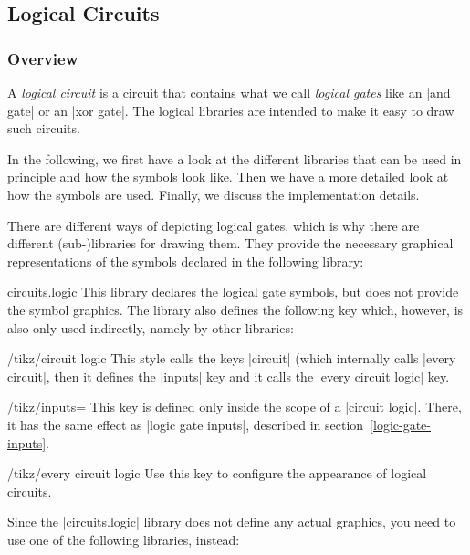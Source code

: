 \subsection{Logical Circuits}

\subsubsection{Overview}

A \emph{logical circuit} is a circuit that contains what we call \emph{logical
gates} like an |and gate| or an |xor gate|. The logical libraries are intended
to make it easy to draw such circuits.

In the following, we first have a look at the different libraries that can be
used in principle and how the symbols look like. Then we have a more detailed
look at how the symbols are used. Finally, we discuss the implementation
details.

There are different ways of depicting logical gates, which is why there are
different (sub-)libraries for drawing them. They provide the necessary
graphical representations of the symbols declared in the following library:

\begin{tikzlibrary}{circuits.logic}
    This library declares the logical gate symbols, but does not provide the
    symbol graphics. The library also defines the following key which, however,
    is also only used indirectly, namely by other libraries:
    \begin{key}{/tikz/circuit logic}
        This style calls the keys |circuit| (which internally calls
        |every circuit|, then it defines the |inputs| key and it calls the
        |every circuit logic| key.
        \begin{key}{/tikz/inputs=}
            This key is defined only inside the scope of a |circuit logic|.
            There, it has the same effect as |logic gate inputs|, described in
            section~\ref{logic-gate-inputs}.
        \end{key}
        \begin{stylekey}{/tikz/every circuit logic}
            Use this key to configure the appearance of logical circuits.
        \end{stylekey}
    \end{key}
\end{tikzlibrary}

Since the |circuits.logic| library does not define any actual graphics, you need
to use one of the following libraries, instead:

